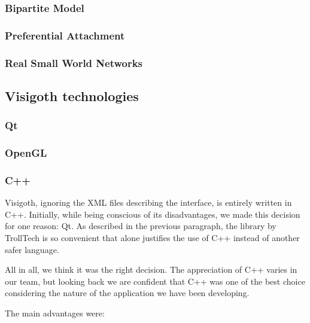 \documentclass[a4paper,11pt,titlepage]{article}
\begin{document}
\subsubsection{Bipartite Model}

\subsubsection{Preferential Attachment}

\subsubsection{Real Small World Networks}

\subsection{Visigoth technologies}

\subsubsection{Qt}

\subsubsection{OpenGL}

\subsubsection{C++}

Visigoth, ignoring the XML files describing the interface, is entirely written
in C++. Initially, while being conscious of its disadvantages, we made this
decision for one reason: Qt. As described in the previous paragraph, the library
by TrollTech is so convenient that alone justifies the use of C++ instead of
another safer language.

All in all, we think it was the right decision. The appreciation of C++ varies
in our team, but looking back we are confident that C++ was one of the best
choice considering the nature of the application we have been developing.

The main advantages were:
\end{document}
